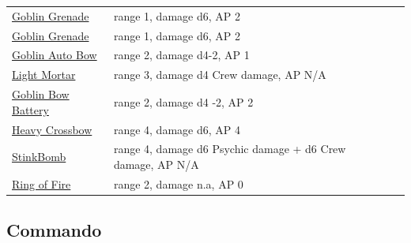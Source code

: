 \documentclass[a4paper,12pt]{article}
\begin{document}
\begin{longtable}{@{}p{}p{}l@{}}
\hyperref[equipment-goblin-grenade]{Goblin Grenade} & range 1, damage d6, AP 2 &  \\
\hyperref[equipment-goblin-grenade-free]{Goblin Grenade} & range 1, damage d6, AP 2 &  \\
\hyperref[equipment-goblin-auto-bow]{Goblin Auto Bow} & range 2, damage d4-2, AP 1 &  \\
\hyperref[equipment-light-mortar]{Light Mortar} & range 3, damage d4 Crew damage, AP N/A &  \\
\hyperref[equipment-goblin-bow-battery]{Goblin Bow Battery} & range 2, damage d4 -2, AP 2 &  \\
\hyperref[equipment-heavy-crossbow]{Heavy Crossbow} & range 4, damage d6, AP 4 &  \\
\hyperref[equipment-stinkbomb]{StinkBomb} & range 4, damage d6 Psychic damage + d6 Crew damage, AP N/A &  \\
\hyperref[equipment-ring-of-fire]{Ring of Fire} & range 2, damage n.a, AP 0 &  \\
\end{longtable}

\subsection{Commando}
\label{equipment-commando}
\end{document}
